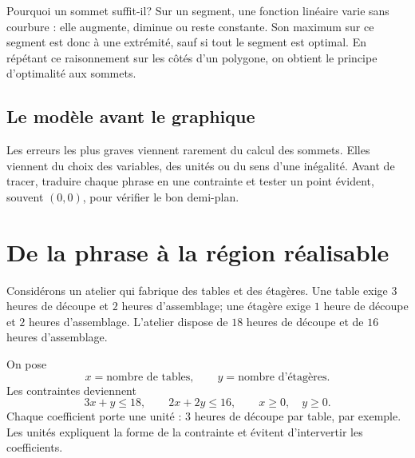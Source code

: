 \documentclass[12pt,a4paper,openany]{book}
\begin{document}
\begin{center}
\end{center}

\begin{connectionbox}
Pourquoi un sommet suffit-il? Sur un segment, une fonction linéaire varie sans courbure : elle augmente, diminue ou reste constante. Son maximum sur ce segment est donc à une extrémité, sauf si tout le segment est optimal. En répétant ce raisonnement sur les côtés d'un polygone, on obtient le principe d'optimalité aux sommets.
\end{connectionbox}

\subsection{Le modèle avant le graphique}
Les erreurs les plus graves viennent rarement du calcul des sommets. Elles viennent du choix des variables, des unités ou du sens d'une inégalité. Avant de tracer, traduire chaque phrase en une contrainte et tester un point évident, souvent $(0,0)$, pour vérifier le bon demi-plan.


\section{De la phrase à la région réalisable}

Considérons un atelier qui fabrique des tables et des étagères. Une table exige $3$ heures de découpe et $2$ heures d'assemblage; une étagère exige $1$ heure de découpe et $2$ heures d'assemblage. L'atelier dispose de $18$ heures de découpe et de $16$ heures d'assemblage.

On pose
\[
x=\text{nombre de tables},
\qquad
y=\text{nombre d'étagères}.
\]
Les contraintes deviennent
\[
3x+y\le18,
\qquad
2x+2y\le16,
\qquad
x\ge0,
\quad y\ge0.
\]
Chaque coefficient porte une unité : $3$ heures de découpe par table, par exemple. Les unités expliquent la forme de la contrainte et évitent d'intervertir les coefficients.
\end{document}
